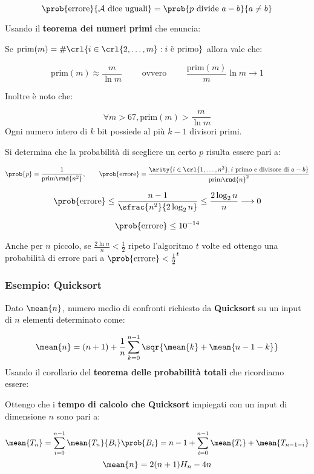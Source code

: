 \documentclass[\main/main.tex]{subfiles}
\begin{document}
\[
	\prob{\text{errore}}{\mathcal{A}\text{ dice uguali}} = \prob{p \text{ divide }a-b}{a \neq b}
\]

Usando il \textbf{teorema dei numeri primi} che enuncia:

\begin{theorem}
	Se \(\text{prim}(m) = \#\crl{i \in \crl{2, \ldots, m}: i \text{ è primo}}\) allora vale che:

	\[
		\text{prim}(m) \approx \frac{m}{\ln m} \qquad \text{ ovvero } \qquad \frac{\text{prim}(m)}{m}\ln m \longrightarrow 1
	\]

	Inoltre è noto che:

	\[
		\forall m > 67, \text{prim}(m) > \frac{m}{\ln m}
	\]
	Ogni numero intero di \(k\) bit possiede al più \(k-1\) divisori primi.
\end{theorem}

Si determina che la probabilità di scegliere un certo \(p\) risulta essere pari a:

\[
	\prob{p} = \frac{1}{\text{prim}\rnd{n^2}}, \qquad \prob{\text{errore}} = \frac{\arity{i \in \crl{1, \ldots, n^2}, i \text{ primo e divisore di }a-b}}{\text{prim}\rnd{n}^2}
\]

\[
	\prob{\text{errore}} \leq \frac{n-1}{\sfrac{n^2}{2\log_2 n}} \leq \frac{2\log_2 n}{n} \longrightarrow 0
\]

\[
	\prob{\text{errore}} \leq 10^{-14}
\]

Anche per \(n\) piccolo, se \(\frac{2\ln n}{n} < \frac{1}{2}\) ripeto l'algoritmo \(t\) volte ed ottengo una probabilità di errore pari a \(\prob{\text{errore}} < \frac{1}{2}^t\)

\subsubsection{Esempio: Quicksort}
Dato \(\mean{n}\), numero medio di confronti richiesto da \textbf{Quicksort} su un input di \(n\) elementi determinato come:

\[
	\mean{n} = (n+1) + \frac{1}{n}\sum_{k=0}^{n-1} \sqr{\mean{k} + \mean{n-1-k}}
\]
Usando il corollario del \textbf{teorema delle probabilità totali} che ricordiamo essere:

\formulaProbTot{}

Ottengo che i \textbf{tempo di calcolo che Quicksort} impiegati con un input di dimensione \(n\) sono pari a:

\[
	\mean{T_n} = \sum_{i = 0}^{n-1} \mean{T_n}{B_i} \prob{B_i} = n-1 + \sum_{i = 0}^{n-1} \mean{T_i} + \mean{T_{n-1-i}}
\]
\[
	\mean{n} = 2(n+1)H_n - 4n
\]
\end{document}
